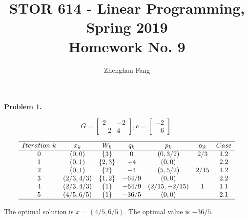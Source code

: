 \documentclass[12pt]{article}
\def\name{Zhenghan Fang}
\begin{document}
 


\title{STOR 614 - Linear Programming, Spring 2019 \\
Homework No. 9}
\author{\name}

\maketitle

\noindent
\textbf{Problem 1.}

\[G=\begin{bmatrix}2&-2\\-2&4\end{bmatrix},c=\begin{bmatrix}-2\\-6\end{bmatrix}.\]

\begin{equation*}
    \begin{array}{ccccccc}
    \hline
         Iteration~k & x_k & W_k & q_k & p_k & \alpha_k & Case  \\ \hline
         0 & (0,0) & \{3\} & 0 & (0,3/2) & 2/3 & 1.2 \\
         1 & (0,1) & \{2,3\} & -4 & (0,0) &     & 2.2 \\
         2 & (0,1) & \{2\} & -4 & (5,5/2) & 2/15 & 1.2 \\
         3 & (2/3,4/3) & \{1,2\} & -64/9 & (0,0) &  & 2.2 \\
         4 & (2/3,4/3) & \{1\} & -64/9 & (2/15,-2/15) & 1 & 1.1 \\
         5 & (4/5,6/5) & \{1\} & -36/5 & (0,0) &  & 2.1 \\ \hline
    \end{array}
\end{equation*}

The optimal solution is $x=(4/5,6/5)$. The optimal value is $-36/5$.


\end{document}
